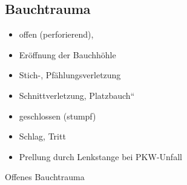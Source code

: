 \documentclass{article}
\begin{document}
\subsection[Bauchtrauma]{Bauchtrauma}
\begin{itemize}
\item {\mdseries
offen (perforierend),}

\end{itemize}
\begin{itemize}
\item {\mdseries
 Er\"offnung der  Bauchh\"ohle}

\item {\mdseries
Stich-, Pf\"ahlungsverletzung}

\item {\mdseries
Schnittverletzung, {\quotedblbase}Platzbauch{\textquotedblleft}}

\end{itemize}
\begin{itemize}
\item {\mdseries
geschlossen (stumpf)}

\end{itemize}
\begin{itemize}
\item {\mdseries
Schlag, Tritt}

\item {\mdseries
Prellung durch Lenkstange bei PKW-Unfall}

\end{itemize}
{\mdseries\color[rgb]{0.0,0.0,0.5019608}
Offenes Bauchtrauma}
\end{document}
